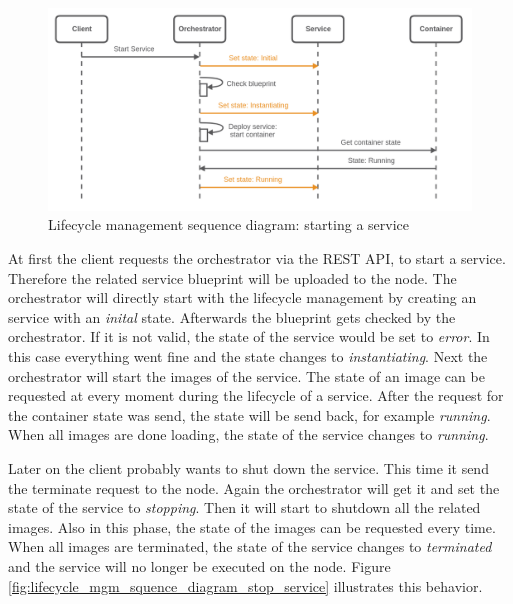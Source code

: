 \begin{figure}[H]
    \centering
    \includegraphics[width=\textwidth]{resources/images/lifecycle_sequence_diagram_start_service.png}
    \caption[Lifecycle management sequence diagram: starting a service]{Lifecycle management sequence diagram: starting a service}
    \label{fig:lifecycle_mgm_squence_diagram_start_service}
\end{figure}

At first the client requests the orchestrator via the \ac{REST} \ac{API}, to start a service.
Therefore the related service blueprint will be uploaded to the node.
The orchestrator will directly start with the lifecycle management by creating an service with an \textit{inital} state.
Afterwards the blueprint gets checked by the orchestrator.
If it is not valid, the state of the service would be set to \textit{error}.
In this case everything went fine and the state changes to \textit{instantiating}.
Next the orchestrator will start the images of the service.
The state of an image can be requested at every moment during the lifecycle of a service.
After the request for the container state was send, the state will be send back, for example \textit{running}.
When all images are done loading, the state of the service changes to \textit{running}.

Later on the client probably wants to shut down the service.
This time it send the terminate request to the node.
Again the orchestrator will get it and set the state of the service to \textit{stopping}.
Then it will start to shutdown all the related images.
Also in this phase, the state of the images can be requested every time.
When all images are terminated, the state of the service changes to \textit{terminated} and the service will no longer be executed on the node.
Figure \ref{fig:lifecycle_mgm_squence_diagram_stop_service} illustrates this behavior.

